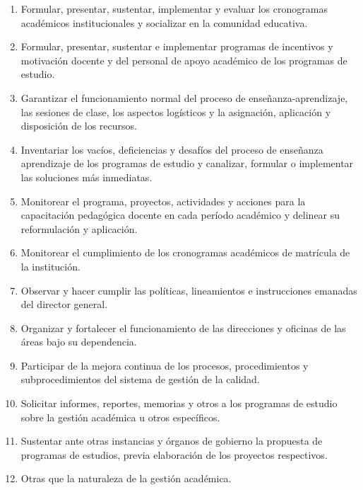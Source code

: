 \begin{enumerate}
\item Formular, presentar, sustentar, implementar y evaluar los cronogramas académicos institucionales y socializar en la comunidad educativa. 
\item Formular, presentar, sustentar e implementar programas de incentivos y motivación docente y del personal de apoyo académico de los programas de estudio. 
\item Garantizar el funcionamiento normal del proceso de enseñanza-aprendizaje, las sesiones de clase, los aspectos logísticos y la asignación, aplicación y disposición de los recursos. 
\item Inventariar los vacíos, deficiencias y desafíos del proceso de enseñanza aprendizaje de los programas de estudio y canalizar, formular o implementar las soluciones más inmediatas.   
\item Monitorear el programa, proyectos, actividades y acciones para la capacitación pedagógica docente en cada período académico y delinear su reformulación y aplicación. 
\item Monitorear el cumplimiento de los cronogramas académicos de matrícula de la institución. 
\item Observar y hacer cumplir las políticas, lineamientos e instrucciones emanadas del director general. 
\item Organizar y fortalecer el funcionamiento de las direcciones y oficinas de las áreas bajo su dependencia. 
\item Participar de la mejora continua de los procesos, procedimientos y subprocedimientos del sistema de gestión de la calidad.  
\item Solicitar informes, reportes, memorias y otros a los programas de estudio sobre la gestión académica u otros específicos. 
\item Sustentar ante otras instancias y órganos de gobierno la propuesta de programas de estudios, previa elaboración de los proyectos respectivos. 
\item Otras que la naturaleza de la gestión académica. 
\end{enumerate}
